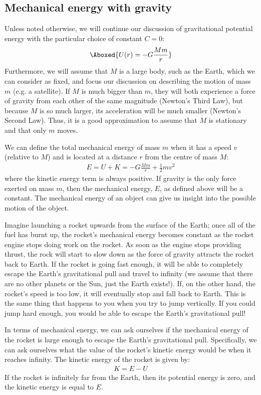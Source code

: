 \subsection{Mechanical energy with gravity}
Unless noted otherwise, we will continue our discussion of gravitational potential energy with the particular choice of constant $C=0$:
\begin{align}
\Aboxed{U(r) = -G\frac{Mm}{r}}
\end{align}
Furthermore, we will assume that $M$ is a large body, such as the Earth, which we can consider as fixed, and focus our discussion on describing the motion of mass $m$ (e.g. a satellite). If $M$ is much bigger than $m$, they will both experience a force of gravity from each other of the same magnitude (Newton's Third Law), but because $M$ is so much larger, its acceleration will be much smaller (Newton's Second Law). Thus, it is a good approximation to assume that $M$ is stationary and that only $m$ moves. 

We can define the total mechanical energy of mass $m$ when it has a speed $v$ (relative to $M$) and is located at a distance $r$ from the centre of mass $M$:
\begin{align*}
E = U + K = -G\frac{Mm}{r}+\frac{1}{2}mv^2
\end{align*}
where the kinetic energy term is always positive. If gravity is the only force exerted on mass $m$, then the mechanical energy, $E$, as defined above will be a constant. The mechanical energy of an object can give us insight into the possible motion of the object.

Imagine launching a rocket upwards from the surface of the Earth; once all of the fuel has burnt up, the rocket's mechanical energy becomes constant as the rocket engine stops doing work on the rocket. As soon as the engine stops providing thrust, the rock will start to slow down as the force of gravity attracts the rocket back to Earth. If the rocket is going fast enough, it will be able to completely escape the Earth's gravitational pull and travel to infinity (we assume that there are no other planets or the Sun, just the Earth exists!). If, on the other hand, the rocket's speed is too low, it will eventually stop and fall back to Earth. This is the same thing that happens to you when you try to jump vertically. If you could jump hard enough, you would be able to escape the Earth's gravitational pull!

In terms of mechanical energy, we can ask ourselves if the mechanical energy of the rocket is large enough to escape the Earth's gravitational pull. Specifically, we can ask ourselves what the value of the rocket's kinetic energy would be when it reaches infinity. The kinetic energy of the rocket is given by:
\begin{align*}
K = E - U
\end{align*} 
If the rocket is infinitely far from the Earth, then its potential energy is zero, and the kinetic energy is equal to $E$.

